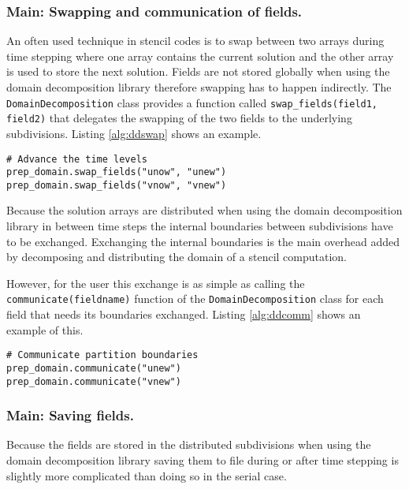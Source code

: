 \subsubsection{Main: Swapping and communication of fields.}
An often used technique in stencil codes is to swap between two arrays during time stepping where one array contains the current solution and the other array is used to store the next solution.
Fields are not stored globally when using the domain decomposition library therefore swapping has to happen indirectly.
The \texttt{DomainDecomposition} class provides a function called \texttt{swap\_fields(field1, field2)} that delegates the swapping of the two fields to the underlying subdivisions.
Listing \ref{alg:ddswap} shows an example.

\begin{lstlisting}[caption={Example swapping two arrays in the domain decomposition libarary},captionpos=b, label={alg:ddswap}, float, floatplacement=H]
# Advance the time levels
prep_domain.swap_fields("unow", "unew")
prep_domain.swap_fields("vnow", "vnew")
\end{lstlisting}

Because the solution arrays are distributed when using the domain decomposition library in between time steps the internal boundaries between subdivisions have to be exchanged.
Exchanging the internal boundaries is the main overhead added by decomposing and distributing the domain of a stencil computation.

However, for the user this exchange is as simple as calling the \texttt{communicate(fieldname)} function of the \texttt{DomainDecomposition} class for each field that needs its boundaries exchanged.
Listing \ref{alg:ddcomm} shows an example of this.

\begin{lstlisting}[caption={Example calling for internal boundary exchange of two fields in the domain decomposition libarary},captionpos=b, label={alg:ddcomm}, float, floatplacement=H]
# Communicate partition boundaries
prep_domain.communicate("unew")
prep_domain.communicate("vnew")
\end{lstlisting}

\subsubsection{Main: Saving fields.}
Because the fields are stored in the distributed subdivisions when using the domain decomposition library saving them to file during or after time stepping is slightly more complicated than doing so in the serial case.

